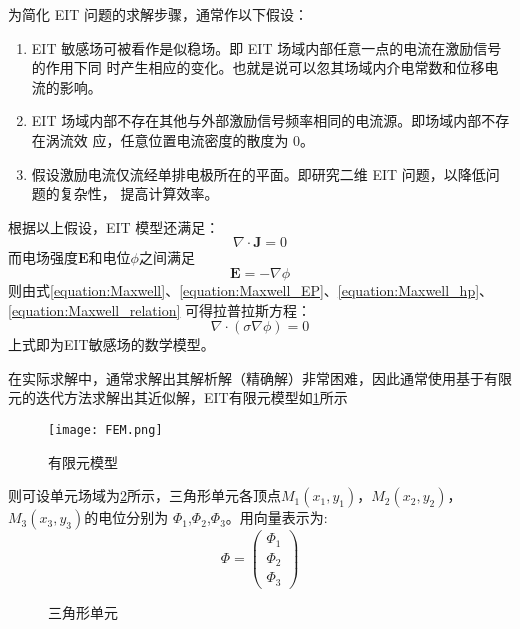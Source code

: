 为简化 EIT 问题的求解步骤，通常作以下假设：
\begin{enumerate}
  \item EIT 敏感场可被看作是似稳场。即 EIT 场域内部任意一点的电流在激励信号的作用下同
  时产生相应的变化。也就是说可以忽其场域内介电常数和位移电流的影响。
  \item EIT 场域内部不存在其他与外部激励信号频率相同的电流源。即场域内部不存在涡流效
  应，任意位置电流密度的散度为 0。
  \item 假设激励电流仅流经单排电极所在的平面。即研究二维 EIT 问题，以降低问题的复杂性，
  提高计算效率。
\end{enumerate}
根据以上假设，EIT 模型还满足：
\begin{equation}
  \label{equation:Maxwell_hp}
  \nabla \cdot \boldsymbol{J} = 0
\end{equation}
而电场强度$\boldsymbol{E}$和电位$\phi$之间满足
\begin{equation}
  \label{equation:Maxwell_EP}
  \boldsymbol{E} = - \nabla \phi
\end{equation}
则由式\cref{equation:Maxwell}、\cref{equation:Maxwell_EP}、\cref{equation:Maxwell_hp}、\cref{equation:Maxwell_relation}
可得拉普拉斯方程：
\begin{equation}
  \nabla \cdot (\sigma\nabla\phi) = 0
\end{equation}
上式即为EIT敏感场的数学模型。

在实际求解中，通常求解出其解析解（精确解）非常困难，因此通常使用基于有限元的迭代方法求解出其近似解，EIT有限元模型如\cref{figure:FEMa}所示
\begin{figure}[h]
\centering
\texttt{[image: FEM.png]}
\caption{有限元模型}
\label{figure:FEMa}
\end{figure}

则可设单元场域为\cref{figure:fem}所示，三角形单元各顶点$M_1(x_1,y_1)$，$M_2(x_2,y_2)$，$M_3(x_3,y_3)$的电位分别为
$\Phi_1$,$\Phi_2$,$\Phi_3$。用向量表示为:
\[
  \Phi =
  \begin{pmatrix}
  \Phi_1 \\
  \Phi_2 \\
  \Phi_3
  \end{pmatrix}
  \]
\begin{figure}[htbp]
    \centering
    
  \caption{三角形单元}
  \label{figure:fem}
\end{figure}

